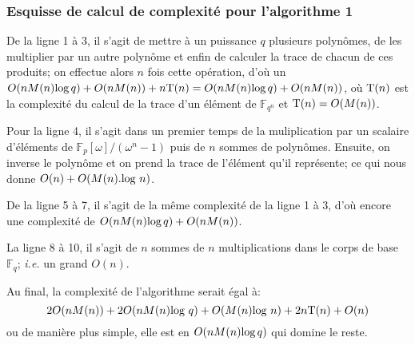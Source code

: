 \documentclass[a4paper]{article} %
\numberwithin{equation}{section}
\newcommand\GF[1]{\mathbb{F}_{#1}}
\begin{document}
\subsubsection*{Esquisse de calcul de complexité pour l'algorithme 1}
De la ligne 1 à 3, il s'agit de mettre à un puissance $q$ plusieurs polynômes, de les multiplier par un autre polynôme et enfin de calculer la trace de chacun de ces produits; on effectue alors $n$ fois cette opération, d'où un $O(nM(n)\textup{log}\,q) + O(nM(n)) + n\textup{T}(n) = O(nM(n)\textup{log}\,q) + O(nM(n))$, où $\textup{T}(n)$ est la complexité du calcul de la trace d'un élément de $\GF{q^n}$ et $\textup{T}(n) = O(M(n))$.\par
Pour la ligne 4, il s'agit dans un premier temps de la muliplication par un scalaire d'éléments de $\mathbb{F}_p[\omega]/(\omega^n - 1)$ puis de $n$ sommes de polynômes. Ensuite, on inverse le polynôme et on prend la trace de l'élément qu'il représente; ce qui nous donne $O(n) + O(M(n).\textup{log }n)$.\par 
De la ligne 5 à 7, il s'agit de la même complexité de la ligne 1 à 3, d'où encore une complexité de $O(nM(n)\textup{log}\,q) + O(nM(n))$.\par
La ligne 8 à 10, il s'agit de $n$ sommes de $n$ multiplications dans le corps de base $\GF{q}$; \textit{i.e.} un grand $O(n)$.\par
Au final, la complexité de l'algorithme serait égal à:
 \[2O(nM(n)) + 2O(nM(n)\textup{log }q) +  O(M(n)\textup{log }n) + 2n\textup{T}(n) + O(n)\] 
ou de manière plus simple, elle est en $O(nM(n)\textup{log}\,q)$ qui domine le reste.
\end{document}
